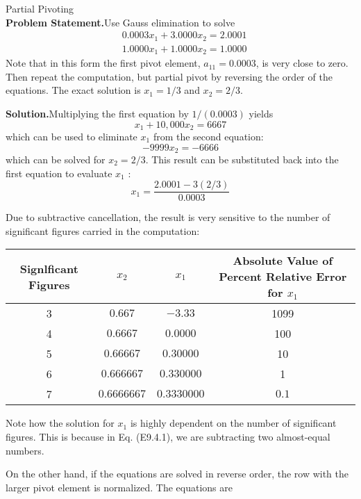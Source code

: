 \documentclass[../main.tex]{subfiles}
\begin{document}
\begin{example} Partial Pivoting\\

    \noindent\textbf{Problem Statement.}\quad Use Gauss elimination to solve\\

    $$
    \begin{aligned}
    &0.0003 x_{1}+3.0000 x_{2}=2.0001 \\
    &1.0000 x_{1}+1.0000 x_{2}=1.0000
    \end{aligned}
    $$
    Note that in this form the first pivot element, $a_{11}=0.0003$, is very close to zero. Then repeat the computation, but partial pivot by reversing the order of the equations. The exact solution is $x_{1}=1 / 3$ and $x_{2}=2 / 3$.

    \noindent\textbf{Solution.}\quad Multiplying the first equation by $1 /(0.0003)$ yields\\
    
    $$
    x_{1}+10,000 x_{2}=6667
    $$
    which can be used to eliminate $x_{1}$ from the second equation:
    $$
    -9999 x_{2}=-6666
    $$
    which can be solved for $x_{2}=2 / 3$. This result can be substituted back into the first equation to evaluate $x_{1}$ :
    $$
    x_{1}=\frac{2.0001-3(2 / 3)}{0.0003}
    $$

    Due to subtractive cancellation, the result is very sensitive to the number of significant figures carried in the computation:
    \bigskip

    \begin{tabular}{cccc}
    \hline Signlficant Figures & $x_{2}$ & $x_{1}$ & Absolute Value of Percent Relative Error for $x_{1}$ \\
    \hline 3 & $0.667$ & $-3.33$ & 1099 \\
    4 & $0.6667$ & $0.0000$ & 100 \\
    5 & $0.66667$ & $0.30000$ & 10 \\
    6 & $0.666667$ & $0.330000$ & 1 \\
    7 & $0.6666667$ & $0.3330000$ & $0.1$ \\
    \hline
    \end{tabular}
    \bigskip

    Note how the solution for $x_{1}$ is highly dependent on the number of significant figures. This is because in Eq. (E9.4.1), we are subtracting two almost-equal numbers.

    On the other hand, if the equations are solved in reverse order, the row with the larger pivot element is normalized. The equations are
    \bigskip


\end{example}
\end{document}

